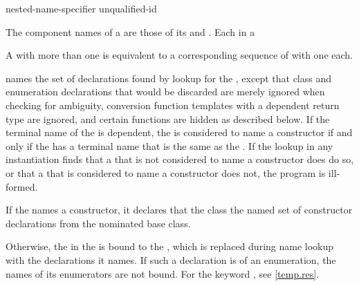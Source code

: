 \begin{bnf}
\br
     nested-name-specifier unqualified-id
\end{bnf}

\pnum
{}%
The component names of a  are those
of its  and .
Each  in a 
\begin{footnote}
A  with more than one
 is equivalent to a corresponding sequence
of  with
one  each.
\end{footnote}
names the set of declarations found by lookup
for the ,
except that class and enumeration declarations that would be discarded
are merely ignored when checking for ambiguity,
conversion function templates with a dependent return type are ignored, and
certain functions are hidden as described below.
If the terminal name of the 
is dependent,
the  is considered to name a constructor
if and only if the  has a terminal name
that is the same as the .
If the lookup in any instantiation finds
that a 
that is not considered to name a constructor does do so, or
that a 
that is considered to name a constructor does not,
the program is ill-formed.

\pnum
{}%
If the  names a constructor,
it declares that the class  the named set of constructor declarations
from the nominated base class.
\begin{note}
Otherwise,
the  in the 
is bound to the ,
which is replaced during name lookup
with the declarations it names.
If such a declaration is of an enumeration,
the names of its enumerators are not bound.
For the keyword , see \ref{temp.res}.
\end{note}

